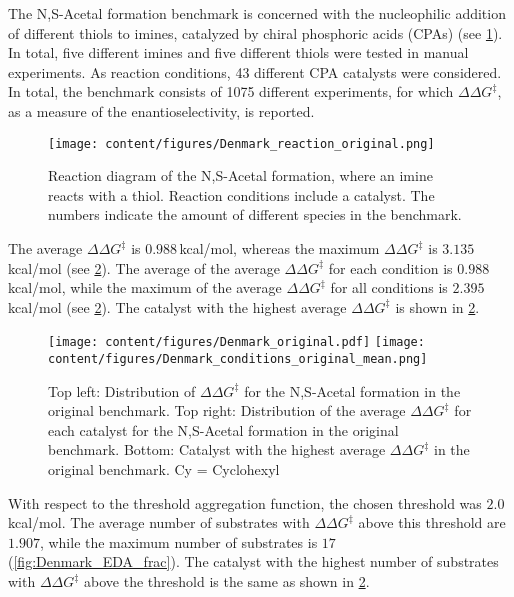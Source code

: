 The N,S-Acetal formation benchmark is concerned with the nucleophilic addition of different thiols to imines, catalyzed by chiral phosphoric acids (CPAs) (see \cref{fig:Denmark_reaction}). 
In total, five different imines and five different thiols were tested in manual experiments. 
As reaction conditions, 43 different CPA catalysts were considered. 
In total, the benchmark consists of 1075 different experiments, for which $\Delta\Delta G^{\ddagger}$, as a measure of the enantioselectivity, is reported.

\begin{figure}[htb]
    \centering
    \texttt{[image: content/figures/Denmark\_reaction\_original.png]}
    \caption{Reaction diagram of the N,S-Acetal formation, where an imine reacts with a thiol. Reaction conditions include a catalyst. The numbers indicate the amount of different species in the benchmark.}
    \label{fig:Denmark_reaction}
\end{figure}

The average $\Delta\Delta G^{\ddagger}$ is $0.988$\,kcal/mol, whereas the maximum $\Delta\Delta G^{\ddagger}$ is $3.135$\,kcal/mol (see \cref{fig:Denmark_EDA}).
The average of the average $\Delta\Delta G^{\ddagger}$ for each condition is $0.988$\,kcal/mol, while the maximum of the average $\Delta\Delta G^{\ddagger}$ for all conditions is $2.395$\,kcal/mol (see \cref{fig:Denmark_EDA}).
The catalyst with the highest average $\Delta\Delta G^{\ddagger}$ is shown in \cref{fig:Denmark_EDA}.

\begin{figure}[htb]
    \centering
    \texttt{[image: content/figures/Denmark\_original.pdf]}
    \texttt{[image: content/figures/Denmark\_conditions\_original\_mean.png]}
    \caption{Top left: Distribution of $\Delta\Delta G^{\ddagger}$ for the N,S-Acetal formation in the original benchmark. Top right: Distribution of the average $\Delta\Delta G^{\ddagger}$ for each catalyst for the N,S-Acetal formation in the original benchmark. Bottom: Catalyst with the highest average $\Delta\Delta G^{\ddagger}$ in the original benchmark. Cy = Cyclohexyl}
    \label{fig:Denmark_EDA}
\end{figure}

With respect to the threshold aggregation function, the chosen threshold was $2.0$\,kcal/mol.
The average number of substrates with $\Delta\Delta G^{\ddagger}$ above this threshold are $1.907$, while the maximum number of substrates is $17$ (\cref{fig:Denmark_EDA_frac}).
The catalyst with the highest number of substrates with $\Delta\Delta G^{\ddagger}$ above the threshold is the same as shown in \cref{fig:Denmark_EDA}.

